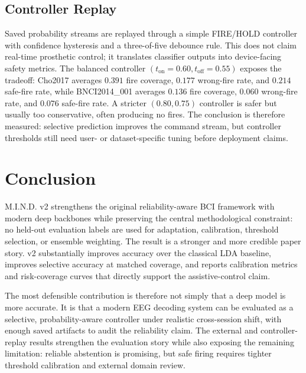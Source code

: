 \documentclass[11pt]{article}
\begin{document}
\subsection{Controller Replay}

Saved probability streams are replayed through a simple FIRE/HOLD controller
with confidence hysteresis and a three-of-five debounce rule. This does not
claim real-time prosthetic control; it translates classifier outputs into
device-facing safety metrics. The balanced controller
\((t_{\mathrm{on}}=0.60, t_{\mathrm{off}}=0.55)\) exposes the tradeoff:
Cho2017 averages \(0.391\) fire coverage, \(0.177\) wrong-fire rate, and
\(0.214\) safe-fire rate, while BNCI2014\_001 averages \(0.136\) fire
coverage, \(0.060\) wrong-fire rate, and \(0.076\) safe-fire rate. A stricter
\((0.80,0.75)\) controller is safer but usually too conservative, often
producing no fires. The conclusion is therefore measured: selective prediction
improves the command stream, but controller thresholds still need user- or
dataset-specific tuning before deployment claims.

\section{Conclusion}

M.I.N.D. v2 strengthens the original reliability-aware BCI framework with
modern deep backbones while preserving the central methodological constraint:
no held-out evaluation labels are used for adaptation, calibration, threshold
selection, or ensemble weighting. The result is a stronger and more credible
paper story. v2 substantially improves accuracy over the classical LDA
baseline, improves selective accuracy at matched coverage, and reports
calibration metrics and risk-coverage curves that directly support the
assistive-control claim.

The most defensible contribution is therefore not simply that a deep model is
more accurate. It is that a modern EEG decoding system can be evaluated as a
selective, probability-aware controller under realistic cross-session shift,
with enough saved artifacts to audit the reliability claim. The external and
controller-replay results strengthen the evaluation story while also exposing
the remaining limitation: reliable abstention is promising, but safe firing
requires tighter threshold calibration and external domain review.
\end{document}
